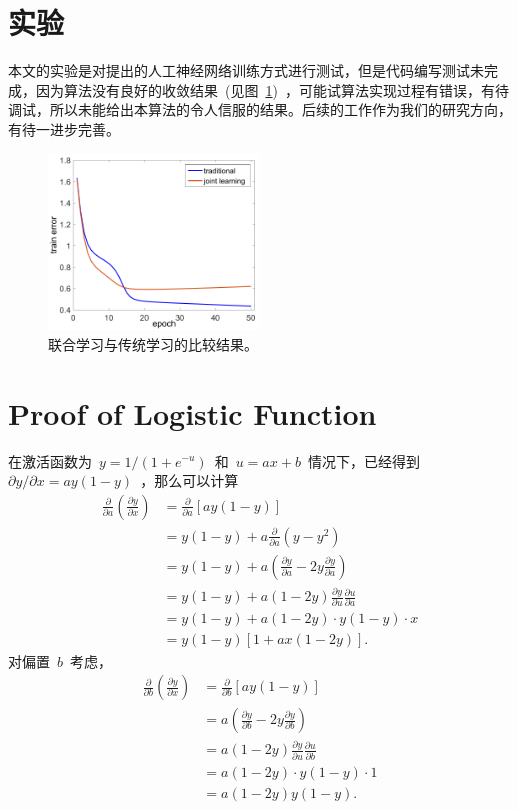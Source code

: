 \documentclass[UTF8,a4paper,12pt]{ctexart}
\numberwithin{equation}{section}
\numberwithin{figure}{section}
\numberwithin{table}{section}
\begin{document}
\section{实验}
本文的实验是对提出的人工神经网络训练方式进行测试，但是代码编写测试未完成，因为算法没有良好的收敛结果~(见图~\ref{fig:IMcompare})~，可能试算法实现过程有错误，有待调试，所以未能给出本算法的令人信服的结果。后续的工作作为我们的研究方向，有待一进步完善。
\begin{figure}[htbp]
	\centering
	\includegraphics[width=0.5\textwidth]{IMcompare.pdf}
	\caption{联合学习与传统学习的比较结果。} \label{fig:IMcompare}
\end{figure}
\appendix
\section{Proof of Logistic Function} \label{appendix1}
在激活函数为~$y=1/(1+e^{-u})$~和~$u=ax+b$~情况下，已经得到~$\partial y / \partial x = ay(1-y)$~，那么可以计算
\begin{align}
\frac{\partial}{\partial a} \left( \frac{\partial y}{\partial x} \right) &= \frac{\partial}{\partial a} [ ay(1-y) ] \nonumber \\
&= y(1-y) + a \frac{\partial}{\partial a} (y - y^2) \nonumber \\
&= y(1-y) + a \left( \frac{\partial y}{\partial a} - 2y \frac{\partial y}{\partial a} \right) \nonumber \\
&= y(1-y) + a(1-2y)\frac{\partial y}{\partial u} \frac{\partial u}{\partial a} \nonumber \\
&= y(1-y) + a(1-2y) \cdot y(1-y) \cdot x \nonumber \\
&= y(1-y)[1+ax(1-2y)]. 
\end{align}
对偏置~$b$~考虑，
\begin{align}
\frac{\partial}{\partial b} \left( \frac{\partial y}{\partial x} \right) &= \frac{\partial}{\partial b} [ ay(1-y) ] \nonumber \\
&= a \left( \frac{\partial y}{\partial b} - 2y \frac{\partial y}{\partial b} \right) \nonumber \\
&= a(1-2y)\frac{\partial y}{\partial u} \frac{\partial u}{\partial b} \nonumber \\
&= a(1-2y) \cdot y(1-y) \cdot 1 \nonumber \\
&= a(1-2y)y(1-y). 
\end{align}
\end{document}
